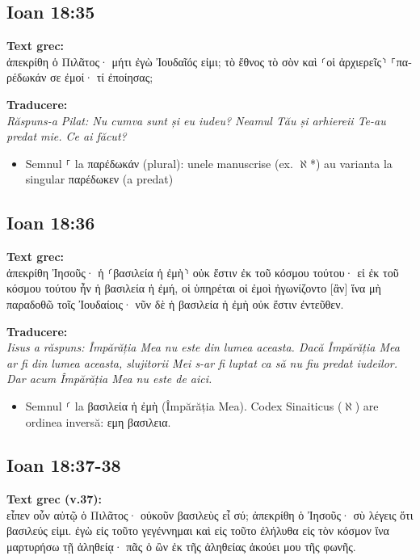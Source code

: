 \documentclass[11pt, a4paper]{article}
\newcommand{\textgreek}[1]{\foreignlanguage{greek}{#1}}
\begin{document}
\subsection{Ioan 18:35}
\textbf{Text grec:} \\
\textgreek{ἀπεκρίθη ὁ Πιλᾶτος· μήτι ἐγὼ Ἰουδαῖός εἰμι; τὸ ἔθνος τὸ σὸν καὶ ⸂οἱ ἀρχιερεῖς⸃ ⸀παρέδωκάν σε ἐμοί· τί ἐποίησας;}

\textbf{Traducere:} \\
\textit{Răspuns-a Pilat: Nu cumva sunt și eu iudeu? Neamul Tău și arhiereii Te-au predat mie. Ce ai făcut?}

\begin{itemize}
    \item Semnul \textgreek{⸀} la \textgreek{παρέδωκάν} (plural): unele manuscrise (ex. $\aleph$*) au varianta la singular \textgreek{παρέδωκεν} (a predat)
\end{itemize}

\subsection{Ioan 18:36}
\textbf{Text grec:} \\
\textgreek{ἀπεκρίθη Ἰησοῦς· ἡ ⸂βασιλεία ἡ ἐμὴ⸃ οὐκ ἔστιν ἐκ τοῦ κόσμου τούτου· εἰ ἐκ τοῦ κόσμου τούτου ἦν ἡ βασιλεία ἡ ἐμή, οἱ ὑπηρέται οἱ ἐμοὶ ἠγωνίζοντο [ἂν] ἵνα μὴ παραδοθῶ τοῖς Ἰουδαίοις· νῦν δὲ ἡ βασιλεία ἡ ἐμὴ οὐκ ἔστιν ἐντεῦθεν.}

\textbf{Traducere:} \\
\textit{Iisus a răspuns: Împărăția Mea nu este din lumea aceasta. Dacă Împărăția Mea ar fi din lumea aceasta, slujitorii Mei s-ar fi luptat ca să nu fiu predat iudeilor. Dar acum Împărăția Mea nu este de aici.}

\begin{itemize}
    \item Semnul \textgreek{⸂} la \textgreek{βασιλεία ἡ ἐμὴ} (Împărăția Mea). Codex Sinaiticus ($\aleph$) are ordinea inversă: \textgreek{εμη βασιλεια}.
\end{itemize}

\subsection{Ioan 18:37-38}
\textbf{Text grec (v.37):} \\
\textgreek{εἶπεν οὖν αὐτῷ ὁ Πιλᾶτος· οὐκοῦν βασιλεὺς εἶ σύ; ἀπεκρίθη ὁ Ἰησοῦς· σὺ λέγεις ὅτι βασιλεύς εἰμι. ἐγὼ εἰς τοῦτο γεγέννημαι καὶ εἰς τοῦτο ἐλήλυθα εἰς τὸν κόσμον ἵνα μαρτυρήσω τῇ ἀληθείᾳ· πᾶς ὁ ὢν ἐκ τῆς ἀληθείας ἀκούει μου τῆς φωνῆς.}
\end{document}
